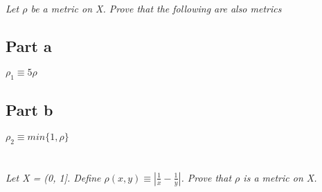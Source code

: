\documentclass[]{article}
\begin{document}

	\section{}
		\emph{Let $\rho$ be a metric on X. Prove that the following are also metrics}
		\subsection*{Part a} 
			$\rho_1 \equiv 5 \rho$ 
		\subsection*{Part b}
			$\rho_2 \equiv min\{1, \rho\}$

	\section{}
		\textit{Let X = (0, 1]. Define $\rho(x, y) \equiv \left | \frac{1}{x} - \frac{1}{y} \right |$. Prove that $\rho$ is a metric on X.}
\end{document}
